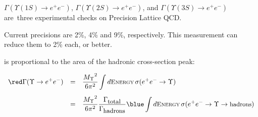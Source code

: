 \begin{slide*}

\slideframe{}

\begin{minipage}[t]{\linewidth}
\Large

\vspace{0.25cm}

$\Gamma(\Upsilon(1S) \to e^+ e^-)$, $\Gamma(\Upsilon(2S) \to e^+ e^-)$,
and $\Gamma(\Upsilon(3S) \to e^+ e^-)$
\mbox{are three} experimental checks on Precision Lattice QCD.

\vspace{0.25cm}

Current precisions are 2\%, 4\% and 9\%, respectively.  This
measurement can reduce them to 2\% each, or better.

\vspace{1cm}


\vspace{0.25cm}

\begin{minipage}{1.2\linewidth}
  {\red \gamee} is proportional to {\blue the area
    of the hadronic cross-section peak:}
\end{minipage}

\[ \begin{array}{r c l}
\displaystyle {\red \Gamma(\Upsilon \to e^+ e^-)} &=&
\displaystyle\frac{\mbox{$M_\Upsilon$}^2}{6 \pi^2} \int d\mbox{\sc \small Energy} \, \sigma(e^+ e^- \to \Upsilon) 
\vspace{0.3cm} \\
&=& \displaystyle \frac{\mbox{$M_\Upsilon$}^2}{6 \pi^2}
    \frac{\Gamma_{\mbox{\small total}}}{\Gamma_{\mbox{\small hadrons}}} {\blue \int d\mbox{\sc \small Energy} \,
    \sigma(e^+ e^- \to \Upsilon \to \mbox{\small hadrons})}
\end{array} \]

\vspace{0.25cm}

\begin{center}
\end{center}

\end{minipage}

\end{slide*}


